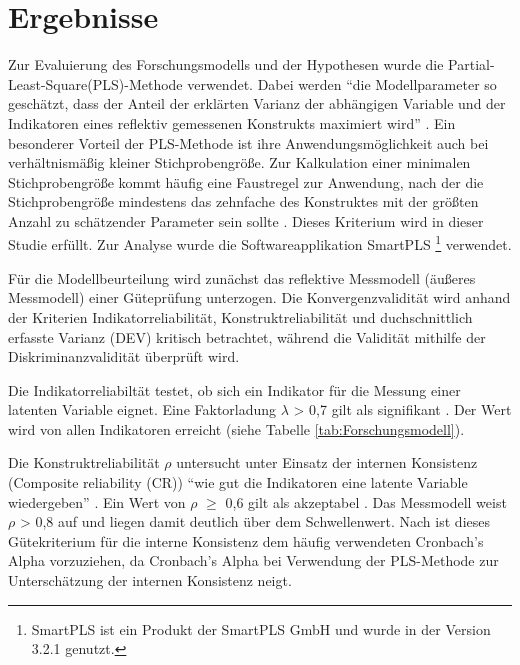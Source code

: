\section{Ergebnisse}
\label{sec:ergebnisse}
\nocite{lohmoller2013latent}
Zur Evaluierung des Forschungsmodells und der Hypothesen wurde die Partial-Least-Square(PLS)-Methode verwendet. Dabei werden "`die Modellparameter so geschätzt, dass der Anteil der erklärten Varianz der abhängigen Variable und der Indikatoren eines reflektiv gemessenen Konstrukts maximiert wird"' \parencite[S.16]{nitzl2010anwenderorientierte}. Ein besonderer Vorteil der PLS-Methode ist ihre Anwendungsmöglichkeit auch bei verhältnismäßig kleiner Stichprobengröße. Zur Kalkulation einer minimalen Stichprobengröße kommt häufig eine Faustregel zur Anwendung, nach der die Stichprobengröße mindestens das zehnfache des Konstruktes mit der größten Anzahl zu schätzender Parameter sein sollte \parencite[vgl.][S.394]{islam2013investigating}. Dieses Kriterium wird in dieser Studie erfüllt. Zur Analyse wurde die Softwareapplikation SmartPLS \footnote{SmartPLS ist ein Produkt der SmartPLS GmbH und wurde in der Version 3.2.1 genutzt.} verwendet. 

Für die Modellbeurteilung wird zunächst das reflektive Messmodell (äußeres Messmodell) einer Güteprüfung unterzogen. Die Konvergenzvalidität wird anhand der Kriterien Indikatorreliabilität, Konstruktreliabilität und duchschnittlich erfasste Varianz (DEV) kritisch betrachtet, während die Validität mithilfe der Diskriminanzvalidität überprüft wird.

Die Indikatorreliabiltät testet, ob sich ein Indikator für die Messung einer latenten Variable eignet. Eine Faktorladung $\lambda$ > 0,7 gilt als signifikant \parencite[vgl.][S.24]{nitzl2010anwenderorientierte}. Der Wert wird von allen Indikatoren erreicht (siehe Tabelle \ref{tab:Forschungsmodell}). 

Die Konstruktreliabilität $\rho$ untersucht unter Einsatz der internen Konsistenz (Composite reliability (CR)) "`wie gut die Indikatoren eine latente Variable wiedergeben"' \parencite[S.25]{nitzl2010anwenderorientierte}. Ein Wert von $\rho$ $\geq$ 0,6 gilt als akzeptabel \parencite[vgl.][S.212]{ringle2007beurteilung}. Das Messmodell weist $\rho$ > 0,8 auf und liegen damit deutlich über dem Schwellenwert. Nach \textcite[S.320]{chin1998partial} ist dieses Gütekriterium für die interne Konsistenz dem häufig verwendeten Cronbach's Alpha vorzuziehen, da  Cronbach's Alpha bei Verwendung der PLS-Methode zur Unterschätzung der internen Konsistenz neigt.     

